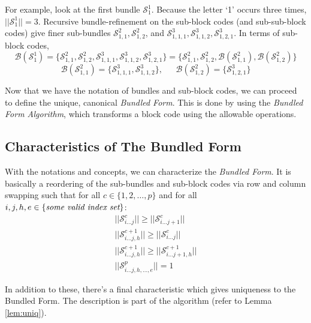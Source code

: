 \documentclass[12pt]{article}  %
\begin{document}
For example, look at the first bundle $\mathcal{S}^1_{1}$. Because the letter `1' occurs three times, $||\mathcal{S}^1_{1}||=3$. Recursive bundle-refinement on the sub-block codes (and sub-sub-block codes) give finer sub-bundles $\mathcal{S}^2_{1,1},\mathcal{S}^2_{1,2}$, and $\mathcal{S}^3_{1,1,1},\mathcal{S}^3_{1,1,2},\mathcal{S}^3_{1,2,1}$. In terms of sub-block codes,
$$\mathcal{B}(\mathcal{S}^1_{1}) =
\{\mathcal{S}^2_{1,1},\mathcal{S}^2_{1,2}, \mathcal{S}^3_{1,1,1},\mathcal{S}^3_{1,1,2},\mathcal{S}^3_{1,2,1}\}=
\{\mathcal{S}^2_{1,1},\mathcal{S}^2_{1,2}, \mathcal{B}(\mathcal{S}^2_{1,1}),\mathcal{B}(\mathcal{S}^2_{1,2}) \}$$
$$\mathcal{B}(\mathcal{S}^2_{1,1}) = \{ \mathcal{S}^3_{1,1,1},\mathcal{S}^3_{1,1,2}\},\ \ \ \ \ \ \ \mathcal{B}(\mathcal{S}^2_{1,2}) = \{ \mathcal{S}^3_{1,2,1}\}$$



Now that we have the notation of bundles and sub-block codes, we can proceed to define the unique, canonical \textit{Bundled Form}. This is done by using the \textit{Bundled Form Algorithm}, which transforms a block code using the allowable operations.














\subsection{Characteristics of The Bundled Form}

With the notations and concepts, we can characterize the \emph{Bundled Form}. It is basically a reordering of the sub-bundles and sub-block codes via row and column swapping such that for all $c \in \{1,2,\dots,p\}$ and for all $ i,j,h,e \in \{\emph{some valid index set}\}$:
\begin{align}
||\mathcal{S}^{c}_{i \dots j}|| \geq
||\mathcal{S}^{c}_{i \dots j+1}||\\
||\mathcal{S}^{c+1}_{i \dots j,h}|| \geq
||\mathcal{S}^{c}_{i \dots j}||\\
||\mathcal{S}^{c+1}_{i \dots j,h}|| \geq
||\mathcal{S}^{c+1}_{i \dots j+1,h}||\\
||\mathcal{S}^{p}_{i \dots j,h,\dots,e}||=1
\end{align}

In addition to these, there's a final characteristic which gives uniqueness to the Bundled Form. The description is part of the algorithm (refer to Lemma \ref{lem:uniq}).
\end{document}
